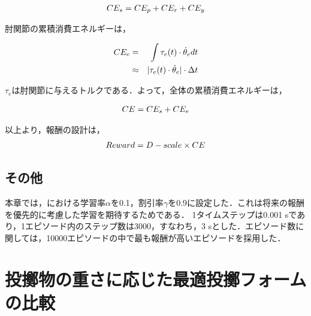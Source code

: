 \begin{eqnarray}
  \equlabel{5.10}
  CE_{s} = CE_{p} + CE_{r} + CE_{y}
\end{eqnarray}

肘関節の累積消費エネルギーは，

\begin{eqnarray}
  \equlabel{5.11}
  CE_{e}&=&\int \tau_{e}(t)\cdot\dot{\theta}_{e} dt\\
        &\approx&|\tau_{e}(t)\cdot\dot{\theta}_{e}|\cdot\Delta t
\end{eqnarray}

$\tau_{e}$は肘関節に与えるトルクである．よって，全体の累積消費エネルギーは，

\begin{eqnarray}
  \equlabel{5.12}
  CE = CE_{s} + CE_{e}
\end{eqnarray}

以上より，報酬の設計は，
\begin{eqnarray}
  \equlabel{5.13}
  Reward = D - scale \times CE
\end{eqnarray}

\subsection{その他}
本章では，における学習率$\alpha$を0.1，割引率$\gamma$を0.9に設定した．これは将来の報酬を優先的に考慮した学習を期待するためである．
1タイムステップは0.001 sであり，1エピソード内のステップ数は3000，すなわち，3 sとした．エピソード数に関しては，10000エピソードの中で最も報酬が高いエピソードを採用した．

\section{投擲物の重さに応じた最適投擲フォームの比較}
